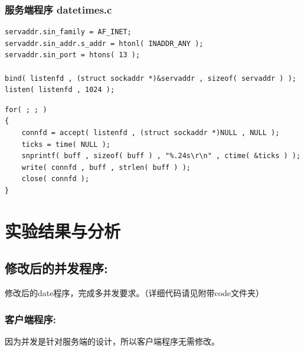 \documentclass[UTF8]{ctexart}
\begin{document}
\subsubsection{服务端程序 datetimes.c}
\begin{lstlisting}
servaddr.sin_family = AF_INET;
servaddr.sin_addr.s_addr = htonl( INADDR_ANY );
servaddr.sin_port = htons( 13 );

bind( listenfd , (struct sockaddr *)&servaddr , sizeof( servaddr ) );
listen( listenfd , 1024 );
\end{lstlisting}

\begin{lstlisting}
for( ; ; )
{
    connfd = accept( listenfd , (struct sockaddr *)NULL , NULL );
    ticks = time( NULL );
    snprintf( buff , sizeof( buff ) , "%.24s\r\n" , ctime( &ticks ) );
    write( connfd , buff , strlen( buff ) );
    close( connfd );
}

\end{lstlisting}


\section{实验结果与分析}
\subsection{修改后的并发程序:}{修改后的date程序，完成多并发要求。（详细代码请见附带code文件夹）}
\subsubsection{客户端程序:}{因为并发是针对服务端的设计，所以客户端程序无需修改。}
\end{document}
